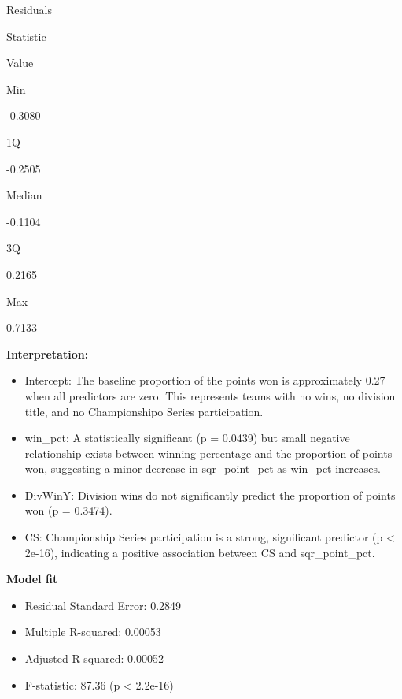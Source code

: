 \documentclass[
]{article}
\begin{document}
Residuals

Statistic

Value

Min

-0.3080

1Q

-0.2505

Median

-0.1104

3Q

0.2165

Max

0.7133

\textbf{Interpretation:}

\begin{itemize}
\item
  Intercept: The baseline proportion of the points won is approximately
  0.27 when all predictors are zero. This represents teams with no wins,
  no division title, and no Championshipo Series participation.
\item
  win\_pct: A statistically significant (p = 0.0439) but small negative
  relationship exists between winning percentage and the proportion of
  points won, suggesting a minor decrease in sqr\_point\_pct as win\_pct
  increases.
\item
  DivWinY: Division wins do not significantly predict the proportion of
  points won (p = 0.3474).
\item
  CS: Championship Series participation is a strong, significant
  predictor (p \textless{} 2e-16), indicating a positive association
  between CS and sqr\_point\_pct.
\end{itemize}

\textbf{Model fit}

\begin{itemize}
\item
  Residual Standard Error: 0.2849
\item
  Multiple R-squared: 0.00053
\item
  Adjusted R-squared: 0.00052
\item
  F-statistic: 87.36 (p \textless{} 2.2e-16)
\end{itemize}
\end{document}
